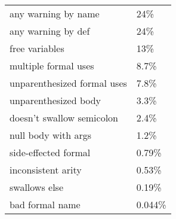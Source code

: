 \begin{tabular}{|l|l|} \hline
any warning by name & 24\% \\ 
any warning by def & 24\% \\ 
free variables & 13\% \\ 
multiple formal uses & 8.7\% \\ 
unparenthesized formal uses & 7.8\% \\ 
unparenthesized body & 3.3\% \\ 
doesn't swallow semicolon & 2.4\% \\ 
null body with args & 1.2\% \\ 
side-effected formal & 0.79\% \\ 
inconsistent arity & 0.53\% \\ 
swallows else & 0.19\% \\
bad formal name & 0.044\% \\ 
\hline
\end{tabular}
